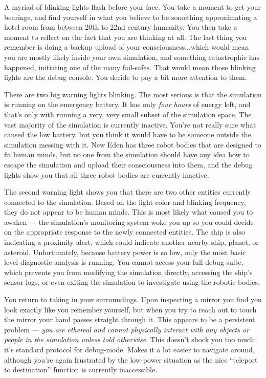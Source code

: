 \documentclass[char]{guildcamp1}
\begin{document}
A myriad of blinking lights flash before your face. You take a moment to get your bearings, and find yourself in what you believe to be something approximating a hotel room from between 20th to 22nd century humanity. You then take a moment to reflect on the fact that you are thinking at all. The last thing you remember is doing a backup upload of your consciousness...which would mean you are mostly likely inside your own simulation, and something catastrophic has happened, initiating one of the many fail-safes. That would mean those blinking lights are the debug console. You decide to pay a bit more attention to them.

There are two big warning lights blinking. The most serious is that the simulation is running on the emergency battery. It has only \emph{four hours} of energy left, and that's only with running a very, very small subset of the simulation space. The vast majority of the simulation is currently inactive. You're not really sure what caused the low battery, but you think it would have to be someone outside the simulation messing with it. New Eden has three robot bodies that are designed to fit human minds, but no one from the simulation should have any idea how to escape the simulation and upload their consciousness into them, and the debug lights show you that all three robot bodies are currently inactive.

The second warning light shows you that there are two other entities currently connected to the simulation. Based on the light color and blinking frequency, they do not appear to be human minds. This is most likely what caused you to awaken --- the simulation's monitoring system woke you up so you could decide on the appropriate response to the newly connected entities. The ship is also indicating a proximity alert, which could indicate another nearby ship, planet, or asteroid. Unfortunately, because battery power is so low, only the most basic level diagnostic analysis is running. You cannot access your full debug suite, which prevents you from modifying the simulation directly, accessing the ship's sensor logs, or even exiting the simulation to investigate using the robotic bodies.

You return to taking in your surroundings. Upon inspecting a mirror you find you look exactly like you remember yourself, but when you try to reach out to touch the mirror your hand passes straight through it. This appears to be a persistent problem --- \emph{you are ethereal and cannot physically interact with any objects or people in the simulation unless told otherwise}. This doesn't shock you too much; it's standard protocol for debug-mode. Makes it a lot easier to navigate around, although you're again frustrated by the low-power situation as the nice ``teleport to destination'' function is currently inaccessible.
\end{document}
